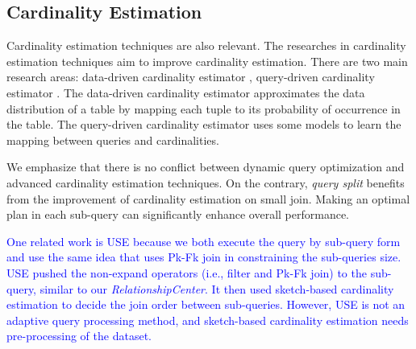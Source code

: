 \subsection{Cardinality Estimation} \label{S83}
    Cardinality estimation techniques \cite{paper33} are also relevant. The researches in cardinality estimation techniques aim to improve cardinality estimation. There are two main research areas: data-driven cardinality estimator \cite{paper1, paper5, paper8, paper9, paper17, paper19, paper21, paper22, paper23, paper36}, query-driven cardinality estimator \cite{paper12, paper14, paper15, paper16, paper18, paper34, paper37}. The data-driven cardinality estimator approximates the data distribution of a table by mapping each tuple to its probability of occurrence in the table. The query-driven cardinality estimator uses some models to learn the mapping between queries and cardinalities.\par
    We emphasize that there is no conflict between dynamic query optimization and advanced cardinality estimation techniques. On the contrary, \textit{query split} benefits from the improvement of cardinality estimation on small join. Making an optimal plan in each sub-query can significantly enhance overall performance.\par
\textcolor{blue}{
    One related work is USE \cite{USE} because we both execute the query by sub-query form and use the same idea that uses Pk-Fk join in constraining the sub-queries size. USE pushed the non-expand operators (i.e., filter and Pk-Fk join) to the sub-query, similar to our \textit{RelationshipCenter}. It then used sketch-based cardinality estimation to decide the join order between sub-queries. However, USE is not an adaptive query processing method, and sketch-based cardinality estimation needs pre-processing of the dataset.
}